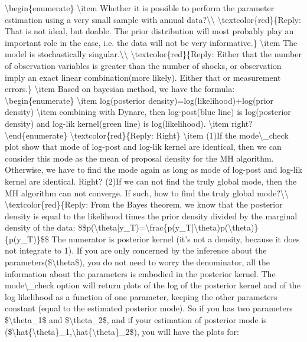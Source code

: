 \documentclass[10pt,math=newtx,citestyle=gb7714-2015,bibstyle=gb7714-2015]{elegantbook}
\begin{document}
	\textbackslash{}begin\{enumerate\}
	\textbackslash{}item Whether it is possible to perform the parameter estimation using a very small sample with annual data?\textbackslash{}\textbackslash{}
	\textbackslash{}textcolor\{red\}\{Reply: That is not ideal, but doable. The prior distribution will most probably play an important role in the case, i.e. the data will not be very informative.\}
	\textbackslash{}item The model is stochastically singular.\textbackslash{}\textbackslash{}
	\textbackslash{}textcolor\{red\}\{Reply: Either that the number of observation variables is greater than the number of shocks, or observation imply an exact linear combination(more likely). Either that or measurement errors.\}
	\textbackslash{}item Based on bayesian method, we have the formula:
	\textbackslash{}begin\{enumerate\}
	\textbackslash{}item log(posterior density)=log(likelihood)+log(prior density)
	\textbackslash{}item combining with Dynare, then log-post(blue line) is log(posterior density) and log-lik kernel(green line) is log(likelihood).
	\textbackslash{}item right?
	\textbackslash{}end\{enumerate\}
	\textbackslash{}textcolor\{red\}\{Reply: Right\}
	\textbackslash{}item (1)If the mode\textbackslash{}\_check plot show that mode of log-post and log-lik kernel are identical, then we can consider this mode as the mean of proposal density for the MH algorithm. Otherwise, we have to find the mode again as long as mode of log-post and log-lik kernel are identical. Right? (2)If we can not find the truly global mode, then the MH algorithm can not converge. If  such, how to find the truly global mode?\textbackslash{}\textbackslash{}
	\textbackslash{}textcolor\{red\}\{Reply: From the Bayes theorem, we know that the posterior density is equal to the likelihood times the prior density divided by the marginal density of the data:
	\$\$p(\textbackslash{}theta|y\_T)=\textbackslash{}frac\{p(y\_T|\textbackslash{}theta)p(\textbackslash{}theta)\}\{p(y\_T)\}\$\$
	The numerator is posterior kernel (it's not a density, because it does not integrate to 1). If you are only concerned by the inference about the parameters(\$\textbackslash{}theta\$), you do not need to worry the denominator, all the information about the parameters is embodied in the posterior kernel. The mode\textbackslash{}\_check option will return plots of the log of the posterior kernel and of the log likelihood as a function of one parameter, keeping the other parameters constant (equal to the estimated posterior mode). So if you has two parameters \$\textbackslash{}theta\_1\$ and \$\textbackslash{}theta\_2\$, and if your estimation of posterior mode is (\$\textbackslash{}hat\{\textbackslash{}theta\}\_1,\textbackslash{}hat\{\textbackslash{}theta\}\_2\$), you will have the plots for:
\end{document}
